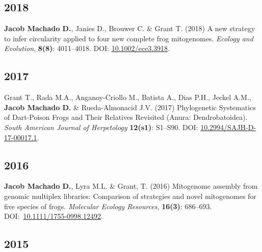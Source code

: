 \documentclass[11pt, letterpaper, sans]{moderncv}
\begin{document}
\subsection{2018}

    {\setlength{\parskip}{.5em}\renewcommand{\baselinestretch}{2.0}\begin{hangparas}{.25in}{1}
		\textbf{Jacob Machado D.}, Janies D., Brouwer C. \& Grant T. (2018) A new strategy to infer circularity applied to four new complete frog mitogenomes. \emph{Ecology and Evolution}, \textbf{8(8)}: 4011--4018. DOI: \href{http://doi.wiley.com/10.1002/ece3.3918}{10.1002/ece3.3918}.
	\end{hangparas}}


\subsection{2017}

    {\setlength{\parskip}{.5em}\renewcommand{\baselinestretch}{2.0}\begin{hangparas}{.25in}{1}
		Grant T., Rada M.A., Anganoy-Criollo M., Batista A., Dias P.H., Jeckel A.M., \textbf{Jacob Machado D.} \& Rueda-Almonacid J.V. (2017) Phylogenetic Systematics of Dart-Poison Frogs and Their Relatives Revisited (Anura: Dendrobatoidea). \emph{South American Journal of Herpetology} \textbf{12(s1)}: S1--S90. DOI: \href{http://www.bioone.org/doi/10.2994/SAJH-D-17-00017.1}{10.2994/SAJH-D-17-00017.1}.
	\end{hangparas}}


\subsection{2016}

    {\setlength{\parskip}{.5em}\renewcommand{\baselinestretch}{2.0}\begin{hangparas}{.25in}{1}
		\textbf{Jacob Machado D.}, Lyra M.L. \& Grant, T. (2016) Mitogenome assembly from genomic multiplex libraries: Comparison of strategies and novel mitogenomes for five species of frogs. \emph{Molecular Ecology Resources}, \textbf{16(3)}: 686--693. DOI:~\href{https://doi.org/10.1111/1755-0998.12492}{10.1111/1755-0998.12492}.
	\end{hangparas}}


\subsection{2015}
\end{document}
